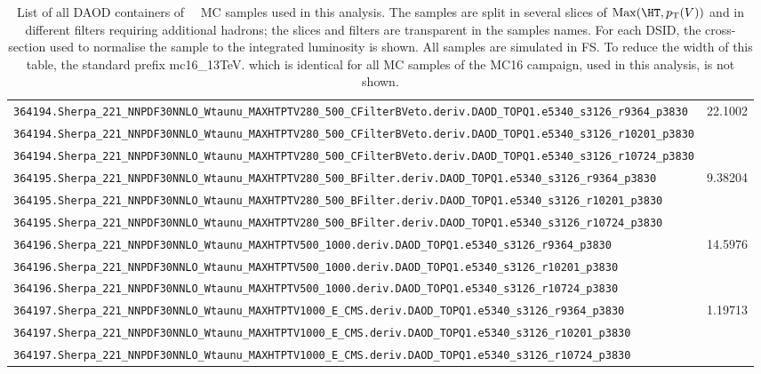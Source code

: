 \begin{table}[htbp]
{\begin{tabular}{l|r}
\verb|364194.Sherpa_221_NNPDF30NNLO_Wtaunu_MAXHTPTV280_500_CFilterBVeto.deriv.DAOD_TOPQ1.e5340_s3126_r9364_p3830|  & \multirow{3}{*}{22.1002} \\
\verb|364194.Sherpa_221_NNPDF30NNLO_Wtaunu_MAXHTPTV280_500_CFilterBVeto.deriv.DAOD_TOPQ1.e5340_s3126_r10201_p3830| & \\
\verb|364194.Sherpa_221_NNPDF30NNLO_Wtaunu_MAXHTPTV280_500_CFilterBVeto.deriv.DAOD_TOPQ1.e5340_s3126_r10724_p3830| & \\ \hline

\verb|364195.Sherpa_221_NNPDF30NNLO_Wtaunu_MAXHTPTV280_500_BFilter.deriv.DAOD_TOPQ1.e5340_s3126_r9364_p3830|       & \multirow{3}{*}{9.38204} \\
\verb|364195.Sherpa_221_NNPDF30NNLO_Wtaunu_MAXHTPTV280_500_BFilter.deriv.DAOD_TOPQ1.e5340_s3126_r10201_p3830|      & \\
\verb|364195.Sherpa_221_NNPDF30NNLO_Wtaunu_MAXHTPTV280_500_BFilter.deriv.DAOD_TOPQ1.e5340_s3126_r10724_p3830|      & \\ \hline

\verb|364196.Sherpa_221_NNPDF30NNLO_Wtaunu_MAXHTPTV500_1000.deriv.DAOD_TOPQ1.e5340_s3126_r9364_p3830|              & \multirow{3}{*}{14.5976} \\
\verb|364196.Sherpa_221_NNPDF30NNLO_Wtaunu_MAXHTPTV500_1000.deriv.DAOD_TOPQ1.e5340_s3126_r10201_p3830|             & \\
\verb|364196.Sherpa_221_NNPDF30NNLO_Wtaunu_MAXHTPTV500_1000.deriv.DAOD_TOPQ1.e5340_s3126_r10724_p3830|             & \\ \hline

\verb|364197.Sherpa_221_NNPDF30NNLO_Wtaunu_MAXHTPTV1000_E_CMS.deriv.DAOD_TOPQ1.e5340_s3126_r9364_p3830|            & \multirow{3}{*}{1.19713} \\
\verb|364197.Sherpa_221_NNPDF30NNLO_Wtaunu_MAXHTPTV1000_E_CMS.deriv.DAOD_TOPQ1.e5340_s3126_r10201_p3830|           & \\
\verb|364197.Sherpa_221_NNPDF30NNLO_Wtaunu_MAXHTPTV1000_E_CMS.deriv.DAOD_TOPQ1.e5340_s3126_r10724_p3830|           & \\ \hline

\bottomrule
\end{tabular}}
  \caption{
    List of all DAOD containers of \Wtaunu\ \sherpa\ MC samples used in this analysis.
    The samples are split in several slices of $\mathrm{Max}(\HT,\pT(V))$ and in different filters requiring additional hadrons;
    the slices and filters are transparent in the samples names.
    For each DSID, the cross-section used to normalise the sample to the integrated luminosity is shown.
    All samples are simulated in FS.
    To reduce the width of this table, the standard prefix \textsf{mc16\_13TeV.} which is identical for all MC samples of the MC16 campaign, used in this analysis, is not shown.
  }
  \label{tab:MC_samples_Wtaunu}
\end{table}

